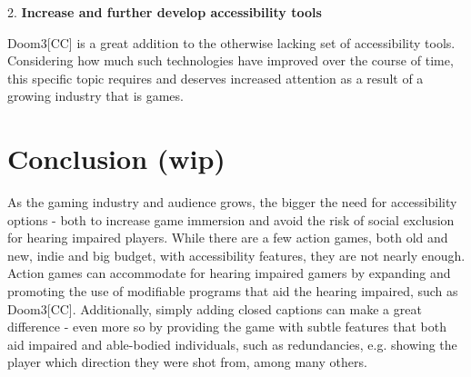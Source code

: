 \documentclass{scrartcl}
\begin{document}
2.	\textbf{Increase and further develop accessibility tools}

\hspace{-4mm}Doom3[CC] is a great addition to the otherwise lacking set of accessibility tools. Considering how much such technologies have improved over the course of time, this specific topic requires and deserves increased attention as a result of a growing industry that is games.

\section{Conclusion (wip)}

As the gaming industry and audience grows, the bigger the need for accessibility options - both to increase game immersion and avoid the risk of social exclusion for hearing impaired players. While there are a few action games, both old and new, indie and big budget, with accessibility features, they are not nearly enough. Action games can accommodate for hearing impaired gamers by expanding and promoting the use of modifiable programs that aid the hearing impaired, such as Doom3[CC]. Additionally, simply adding closed captions can make a great difference - even more so by providing the game with subtle features that both aid impaired and able-bodied individuals, such as redundancies, e.g. showing the player which direction they were shot from, among many others.



\end{document}
